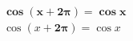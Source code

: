 \documentclass{article} %
\begin{document}
$\pmb{\cos(x+2\pi)=\cos x}$\\

$\cos(x+\pmb{2\pi})=\cos x$
\end{document}

